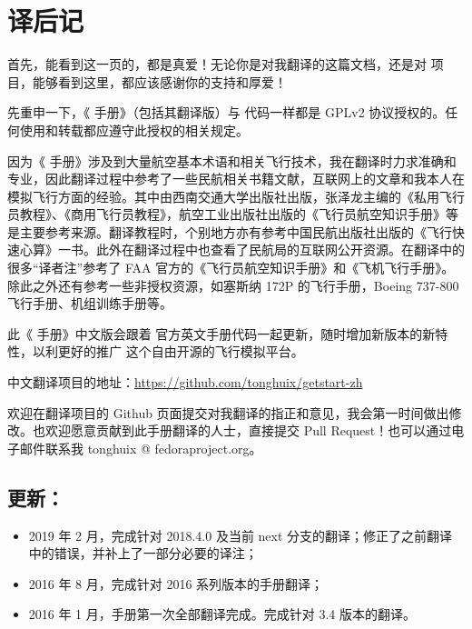 \newpage
\section{译后记}

首先，能看到这一页的，都是真爱！无论你是对我翻译的这篇文档，还是对 \FlightGear{} 项目，能够看到这里，都应该感谢你的支持和厚爱！

先重申一下，《\FlightGear{} 手册》（包括其翻译版）与 \FligtGear{} 代码一样都是 GPLv2 协议授权的。任何使用和转载都应遵守此授权的相关规定。

因为《\FlightGear{} 手册》涉及到大量航空基本术语和相关飞行技术，我在翻译时力求准确和专业，因此翻译过程中参考了一些民航相关书籍文献，互联网上的文章和我本人在模拟飞行方面的经验。其中由西南交通大学出版社出版，张泽龙主编的《私用飞行员教程》、《商用飞行员教程》，航空工业出版社出版的《飞行员航空知识手册》等是主要参考来源。翻译教程时，个别地方亦有参考中国民航出版社出版的《飞行快速心算》一书。此外在翻译过程中也查看了民航局的互联网公开资源。在翻译中的很多“译者注”参考了 FAA 官方的《飞行员航空知识手册》和《飞机飞行手册》。除此之外还有参考一些非授权资源，如塞斯纳 172P 的飞行手册，Boeing 737-800 飞行手册、机组训练手册等。

此《\FlightGear{} 手册》中文版会跟着 \FlightGear{} 官方英文手册代码一起更新，随时增加新版本的新特性，以利更好的推广 \FlightGear{} 这个自由开源的飞行模拟平台。

中文翻译项目的地址：\url{https://github.com/tonghuix/getstart-zh}

欢迎在翻译项目的 Github 页面提交对我翻译的指正和意见，我会第一时间做出修改。也欢迎愿意贡献到此手册翻译的人士，直接提交 Pull Request！也可以通过电子邮件联系我 tonghuix @ fedoraproject.org。

\subsection*{更新：}
\begin{itemize}
\item 2019 年 2 月，完成针对 2018.4.0 及当前 next 分支的翻译；修正了之前翻译中的错误，并补上了一部分必要的译注；
\item 2016 年 8 月，完成针对 2016 系列版本的手册翻译；
\item 2016 年 1 月，手册第一次全部翻译完成。完成针对 3.4 版本的翻译。
\end{itemize}

